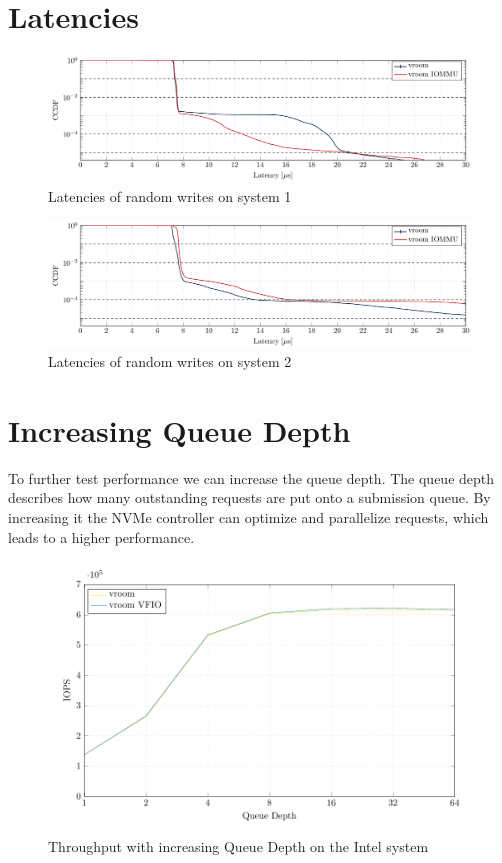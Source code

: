 \section{Latencies}

\begin{figure}
  \centering
  \includegraphics[width=.8\textwidth]{figures/lats_ccdf_2MiB_qd1t1}
  \caption{Latencies of random writes on system 1}
  \label{fig:lats}
\end{figure}

\begin{figure}
  \centering
  \includegraphics[width=.8\textwidth]{figures/lats_ccdf_2MiB_qd1t1_epyc}
  \caption{Latencies of random writes on system 2}
  \label{fig:latsepyc}
\end{figure}

\section{Increasing Queue Depth}
To further test performance we can increase the queue depth. The queue depth describes how many outstanding requests are put onto a submission queue. By increasing it the NVMe controller can optimize and parallelize requests, which leads to a higher performance.

\begin{figure}
  \centering
  \includegraphics[width=.8\textwidth]{figures/qdnt1_2MiB}
  \caption{Throughput with increasing Queue Depth on the Intel system}
  \label{fig:qdnt1}
\end{figure}

